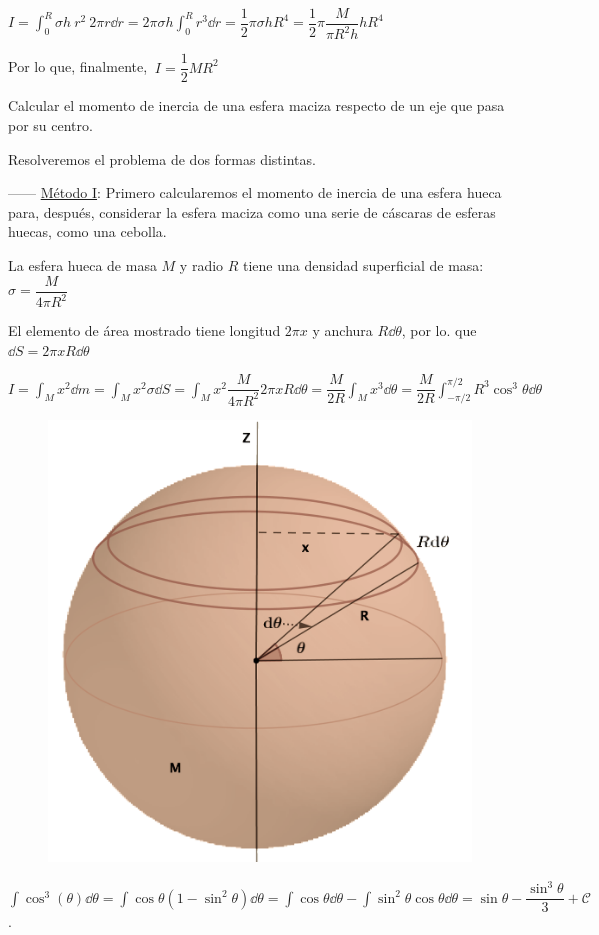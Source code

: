 $I=\displaystyle \int_0^R \sigma h \ r^2 \ 2\pi r \dd r=2\pi \sigma h \int_0^R r^3 \dd r=\dfrac 1 2 \pi \sigma h R^4 = \dfrac 1 2 \pi \dfrac {M}{\pi R^2 h} h R^4 $

Por lo que, finalmente, $\ I=\dfrac 1 2 M R^2$

\begin{prob}
Calcular el momento de inercia de una esfera maciza respecto de un eje que pasa por su centro.	
\end{prob}

Resolveremos el problema de dos formas distintas.

------ \underline{Método I}:  Primero calcularemos el momento de inercia de una esfera hueca para, después, considerar la esfera maciza como una serie de cáscaras de esferas huecas, como una cebolla.

\begin{multicols}{2}
La esfera hueca de masa $M$ y radio $R$ tiene una densidad superficial de masa: $\sigma=\dfrac{M}{4\pi R^2}$

El elemento de área mostrado tiene longitud $2\pi x$ y anchura $R\dd \theta$, por lo. que $\dd S= 2\pi x R \dd \theta$

$I=\displaystyle \int_M x^2 \dd m=\int_M x^2 \sigma \dd S=\int_M x^2 \dfrac {M}{4\pi R^2} 2 \pi x R \dd \theta =\dfrac{M}{2R}\int_M x^3 \dd \theta= \dfrac {M}{2R}\int_{-\pi/2}^{\pi/2}R^3 \cos^3 \theta \dd \theta$
\begin{figure}[H]
	\centering
	\includegraphics[width=.5\textwidth]{imagenes/imagenes16/T16IM16.png}
\end{figure}
\end{multicols}

\textcolor{gris}{\footnotesize{$\displaystyle \int \cos^3(\theta)\dd \theta = \int \cos \theta (1-\sin^2 \theta) \dd \theta = \int  \cos \theta \dd \theta - \int \sin^2 \theta \cos \theta \dd \theta = \sin \theta - \dfrac {\sin^3 \theta}{3} + \mathcal C$}}\normalsize{.}

